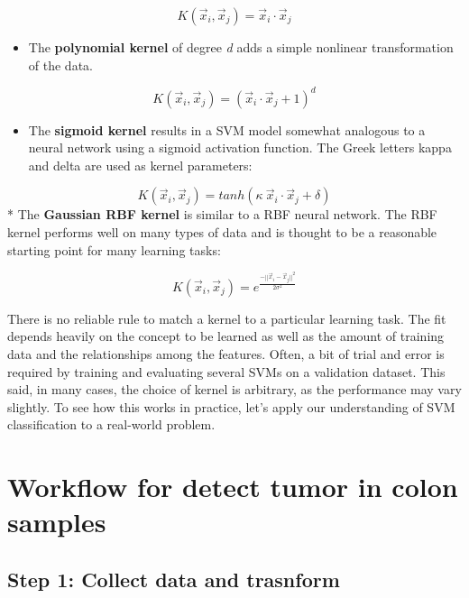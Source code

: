 \documentclass[
]{article}
\providecommand{\tightlist}{%
  \setlength{\itemsep}{0pt}\setlength{\parskip}{0pt}}
\begin{document}
\[K(\vec x_i,\vec x_j) = \vec x_i \cdot \vec x_j\]

\begin{itemize}
\tightlist
\item
  The \textbf{polynomial kernel} of degree \emph{d} adds a simple
  nonlinear transformation of the data.
\end{itemize}

\[ K(\vec x_i,\vec x_j) = (\vec x_i \cdot \vec x_j+1)^d\]

\begin{itemize}
\tightlist
\item
  The \textbf{sigmoid kernel} results in a SVM model somewhat analogous
  to a neural network using a sigmoid activation function. The Greek
  letters kappa and delta are used as kernel parameters:
\end{itemize}

\[ K(\vec x_i,\vec x_j) = tanh(\kappa\ \vec x_i \cdot \vec x_j+\delta)\]
* The \textbf{Gaussian RBF kernel} is similar to a RBF neural network.
The RBF kernel performs well on many types of data and is thought to be
a reasonable starting point for many learning tasks:

\[K(\vec x_i,\vec x_j) = e^{\frac{-||\vec x_i-\vec x_j||^2}{2 \sigma ^2}} \]

There is no reliable rule to match a kernel to a particular learning
task. The fit depends heavily on the concept to be learned as well as
the amount of training data and the relationships among the features.
Often, a bit of trial and error is required by training and evaluating
several SVMs on a validation dataset. This said, in many cases, the
choice of kernel is arbitrary, as the performance may vary slightly. To
see how this works in practice, let's apply our understanding of SVM
classification to a real-world problem.

\hypertarget{workflow-for-detect-tumor-in-colon-samples}{%
\section{Workflow for detect tumor in colon
samples}\label{workflow-for-detect-tumor-in-colon-samples}}

\hypertarget{step-1-collect-data-and-trasnform}{%
\subsection{Step 1: Collect data and
trasnform}\label{step-1-collect-data-and-trasnform}}
\end{document}
